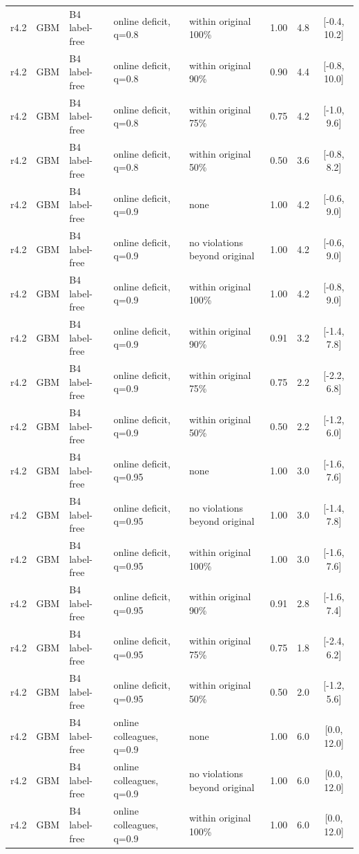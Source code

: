\documentclass[10pt,onecolumn,letterpaper]{article}
\begin{document}
\begin{longtable}{lllp{4.2cm}p{3.4cm}ccc}
r4.2 & GBM & B4 label-free & online deficit, q=0.8 & within original 100\% & 1.00 & 4.8 & [-0.4, 10.2] \\
r4.2 & GBM & B4 label-free & online deficit, q=0.8 & within original 90\% & 0.90 & 4.4 & [-0.8, 10.0] \\
r4.2 & GBM & B4 label-free & online deficit, q=0.8 & within original 75\% & 0.75 & 4.2 & [-1.0, 9.6] \\
r4.2 & GBM & B4 label-free & online deficit, q=0.8 & within original 50\% & 0.50 & 3.6 & [-0.8, 8.2] \\
r4.2 & GBM & B4 label-free & online deficit, q=0.9 & none & 1.00 & 4.2 & [-0.6, 9.0] \\
r4.2 & GBM & B4 label-free & online deficit, q=0.9 & no violations beyond original & 1.00 & 4.2 & [-0.6, 9.0] \\
r4.2 & GBM & B4 label-free & online deficit, q=0.9 & within original 100\% & 1.00 & 4.2 & [-0.8, 9.0] \\
r4.2 & GBM & B4 label-free & online deficit, q=0.9 & within original 90\% & 0.91 & 3.2 & [-1.4, 7.8] \\
r4.2 & GBM & B4 label-free & online deficit, q=0.9 & within original 75\% & 0.75 & 2.2 & [-2.2, 6.8] \\
r4.2 & GBM & B4 label-free & online deficit, q=0.9 & within original 50\% & 0.50 & 2.2 & [-1.2, 6.0] \\
r4.2 & GBM & B4 label-free & online deficit, q=0.95 & none & 1.00 & 3.0 & [-1.6, 7.6] \\
r4.2 & GBM & B4 label-free & online deficit, q=0.95 & no violations beyond original & 1.00 & 3.0 & [-1.4, 7.8] \\
r4.2 & GBM & B4 label-free & online deficit, q=0.95 & within original 100\% & 1.00 & 3.0 & [-1.6, 7.6] \\
r4.2 & GBM & B4 label-free & online deficit, q=0.95 & within original 90\% & 0.91 & 2.8 & [-1.6, 7.4] \\
r4.2 & GBM & B4 label-free & online deficit, q=0.95 & within original 75\% & 0.75 & 1.8 & [-2.4, 6.2] \\
r4.2 & GBM & B4 label-free & online deficit, q=0.95 & within original 50\% & 0.50 & 2.0 & [-1.2, 5.6] \\
r4.2 & GBM & B4 label-free & online colleagues, q=0.9 & none & 1.00 & 6.0 & [0.0, 12.0] \\
r4.2 & GBM & B4 label-free & online colleagues, q=0.9 & no violations beyond original & 1.00 & 6.0 & [0.0, 12.0] \\
r4.2 & GBM & B4 label-free & online colleagues, q=0.9 & within original 100\% & 1.00 & 6.0 & [0.0, 12.0] \\

\end{longtable}
\end{document}
